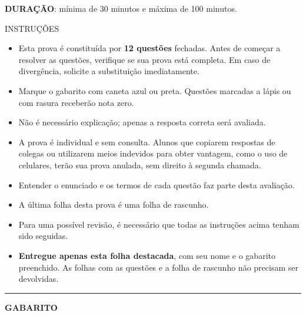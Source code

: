 \begin{titlepage}
\begin{tcolorbox}[width=\linewidth,colback=white]
    \end{tcolorbox}
    
    \noindent\textbf{DURAÇÃO}: mínima de 30 minutos e máxima de 100 minutos.
    
    \vspace{13pt}
    
    \begin{center}
        INSTRUÇÕES
    \end{center}

    \begin{itemize}[left=0pt, topsep=2pt, itemsep=2pt, parsep=0pt]
        \small
        \item Esta prova é constituída por \textbf{12 questões} fechadas. Antes de começar a resolver as questões, verifique se sua prova está completa. Em caso de divergência, solicite a substituição imediatamente.
        \item Marque o gabarito com caneta azul ou preta. Questões marcadas a lápis ou com rasura receberão nota zero.
        \item Não é necessário explicação; apenas a resposta correta será avaliada.
        \item A prova é individual e sem consulta. Alunos que copiarem respostas de colegas ou utilizarem meios indevidos para obter vantagem, como o uso de celulares, terão sua prova anulada, sem direito à segunda chamada.
        \item Entender o enunciado e os termos de cada questão faz parte desta avaliação.
        \item A última folha desta prova é uma folha de rascunho.
        \item Para uma possível revisão, é necessário que todas as instruções acima tenham sido seguidas.
        \item \textbf{Entregue apenas esta folha destacada}, com seu nome e o gabarito preenchido. As folhas com as questões e a folha de rascunho não precisam ser devolvidas.
    \end{itemize}

    \noindent\rule{\linewidth}{1pt}  %
    \vspace{10pt}
    
    \begin{center}
        \textbf{GABARITO}
    \end{center}
    \vspace{10pt}


\end{titlepage}
